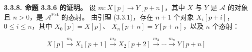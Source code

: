 \medskip\noindent\textbf{3.3.8. 命题 3.3.6 的证明。}\quad
设 $m\colon X[p]\longrightarrow Y[p+n]$，其中 $X$ 与 $Y$ 是
$\mathcal A$ 的对象且 $n>0$，是 $\mathcal A^{\operatorname{Ext}}$ 的态射。
由引理 (3.3.1)，存在 $n+1$ 个对象
$X_i[p+i]$，$0\leq i\leq n$，其中 $X_0[p]=X[p]$、
$X_n[p+n]=Y[p+n]$，以及 $n$ 个态射：

\[
X[p]\xrightarrow{m_1}X_1[p+1]\xrightarrow{m_2}X_2[p+2]
\xrightarrow{m_3}\cdots\xrightarrow{m_n}Y[p+n]
\]
\endgroup
